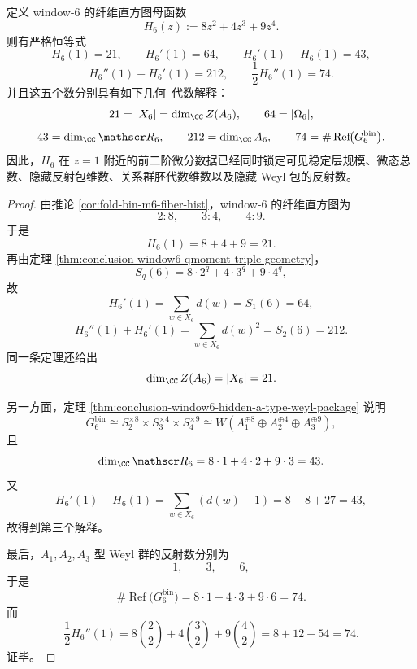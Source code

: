 \begin{theorem}[直方图母函数的五重解码]\label{thm:conclusion-window6-histogram-generator-fivefold-decoding}
定义 window-\(6\) 的纤维直方图母函数
\[
H_6(z):=8z^2+4z^3+9z^4.
\]
则有严格恒等式
\[
H_6(1)=21,
\qquad
H_6'(1)=64,
\qquad
H_6'(1)-H_6(1)=43,
\]
\[
H_6''(1)+H_6'(1)=212,
\qquad
\frac12 H_6''(1)=74.
\]
并且这五个数分别具有如下几何--代数解释：
\[
21=|X_6|=\dim_{\CC}Z(A_6),
\qquad
64=|\Omega_6|,
\]
\[
43=\dim_{\CC}\mathscr R_6,
\qquad
212=\dim_{\CC}A_6,
\qquad
74=\#\operatorname{Ref}\!\bigl(G_6^{\mathrm{bin}}\bigr).
\]
因此，\(H_6\) 在 \(z=1\) 附近的前二阶微分数据已经同时锁定可见稳定层规模、微态总数、隐藏反射包维数、关系群胚代数维数以及隐藏 Weyl 包的反射数。
\end{theorem}
\begin{proof}
由推论 \ref{cor:fold-bin-m6-fiber-hist}，window-\(6\) 的纤维直方图为
\[
2:8,\qquad 3:4,\qquad 4:9.
\]
于是
\[
H_6(1)=8+4+9=21.
\]
再由定理 \ref{thm:conclusion-window6-qmoment-triple-geometry}，
\[
S_q(6)=8\cdot 2^q+4\cdot 3^q+9\cdot 4^q,
\]
故
\[
H_6'(1)=\sum_{w\in X_6}d(w)=S_1(6)=64,
\]
\[
H_6''(1)+H_6'(1)=\sum_{w\in X_6}d(w)^2=S_2(6)=212.
\]
同一条定理还给出
\[
\dim_{\CC}Z(A_6)=|X_6|=21.
\]

另一方面，定理 \ref{thm:conclusion-window6-hidden-a-type-weyl-package} 说明
\[
G_6^{\mathrm{bin}}
\cong
S_2^{\times 8}\times S_3^{\times 4}\times S_4^{\times 9}
\cong
W\!\left(A_1^{\oplus 8}\oplus A_2^{\oplus 4}\oplus A_3^{\oplus 9}\right),
\]
且
\[
\dim_{\CC}\mathscr R_6
=
8\cdot 1+4\cdot 2+9\cdot 3
=43.
\]
又
\[
H_6'(1)-H_6(1)=\sum_{w\in X_6}(d(w)-1)=8+8+27=43,
\]
故得到第三个解释。

最后，\(A_1,A_2,A_3\) 型 Weyl 群的反射数分别为
\[
1,\qquad 3,\qquad 6,
\]
于是
\[
\#\operatorname{Ref}\!\bigl(G_6^{\mathrm{bin}}\bigr)
=
8\cdot 1+4\cdot 3+9\cdot 6
=74.
\]
而
\[
\frac12 H_6''(1)
=
8\binom22+4\binom32+9\binom42
=8+12+54
=74.
\]
证毕。
\end{proof}

